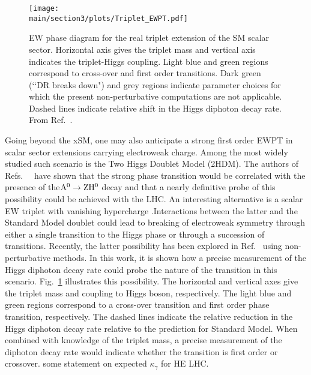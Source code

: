 \begin{figure}[hbtp]
  \begin{center}
  \texttt{[image: \\main/section3/plots/Triplet\_EWPT.pdf]}
    \caption{
    EW phase diagram for the real triplet extension of the SM scalar sector. Horizontal axis gives the triplet mass and vertical axis indicates the triplet-Higgs coupling. Light blue and green regions correspond to cross-over and first order transitions. Dark green (\lq\lq DR breaks down") and grey regions indicate parameter choices for which the present non-perturbative computations are not applicable. Dashed lines indicate relative shift in the Higgs diphoton decay rate. From Ref.~\cite{Niemi:2018asa}.    
        }
    \label{fig:ewpt_triplet}
  \end{center}
\end{figure}

Going beyond the xSM, one may also anticipate a strong first order EWPT in scalar sector extensions carrying electroweak charge. Among the most widely studied such scenario is the Two Higgs Doublet Model (2HDM). The authors of Refs.~~\cite{Dorsch:2013wja,Dorsch:2014qja} have shown that the strong phase transition would be correlated with the presence of the\linebreak $\rm A^0\to Z H^0$ decay and that a nearly definitive probe of this possibility could be achieved with the LHC. An interesting alternative is a scalar EW triplet with vanishing hypercharge .Interactions between the latter and the Standard Model doublet could lead to breaking of electroweak symmetry through either a single transition to the Higgs phase or through a succession of transitions\cite{Patel:2012pi}. Recently, the latter possibility has been explored in Ref.~\cite{Niemi:2018asa} using non-perturbative methods. In this work, it is shown how a precise measurement of the Higgs diphoton decay rate could probe the nature of the transition in this scenario. Fig.~\ref{fig:ewpt_triplet} illustrates this possibility. The horizontal and vertical axes give the triplet mass and coupling to Higgs boson, respectively. The light blue and green regions correspond to a cross-over transition and first order phase transition, respectively. The dashed lines indicate the relative reduction in the Higgs diphoton decay rate relative to the prediction for Standard Model. When combined with knowledge of the triplet mass, a precise measurement of the diphoton decay rate would indicate whether the transition is first order or crossover. {\color{magenta} some statement on expected $\kappa_\gamma$ for HE LHC}.



